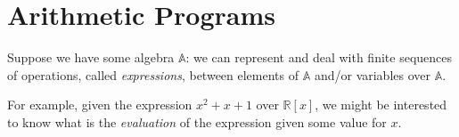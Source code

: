 \section{Arithmetic Programs}
Suppose we have some algebra \(\mathbb{A}\): we can represent and deal with finite sequences of 
operations, called \emph{expressions}, between elements of \(\mathbb{A}\) and/or variables over 
\(\mathbb{A}\).

For example, given the expression \(x^2 + x + 1\) over \(\mathbb{R}\left[x\right]\), we might be 
interested to know what is the \emph{evaluation} of the expression given some value for \(x\).

